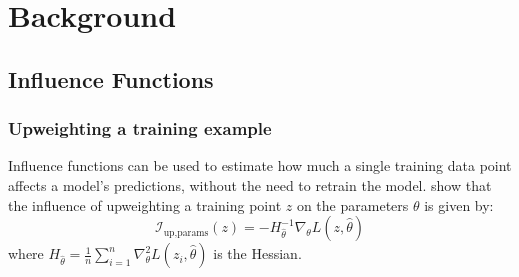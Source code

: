 \documentclass{article}
\theoremstyle{plain}
\theoremstyle{definition}
\theoremstyle{remark}
\begin{document}
\section{Background}

\subsection{Influence Functions}
\subsubsection{Upweighting a training example}
Influence functions can be used to estimate how much a single training data point affects a model's predictions, without the need to retrain the model. \citet{cook1982residuals} show that the influence of upweighting a training point $z$ on the parameters $\theta$ is given by:
\begin{equation}
  \mathcal{I}_{\text{up,params}}(z)
  = -H_{\hat\theta}^{-1}\nabla_\theta L(z,\hat\theta)
\end{equation}
where $H_{\hat{\theta}} = \frac{1}{n} \sum_{i=1}^{n} \nabla_{\theta}^{2} L(z_i, \hat{\theta})$ is the Hessian.
\end{document}

